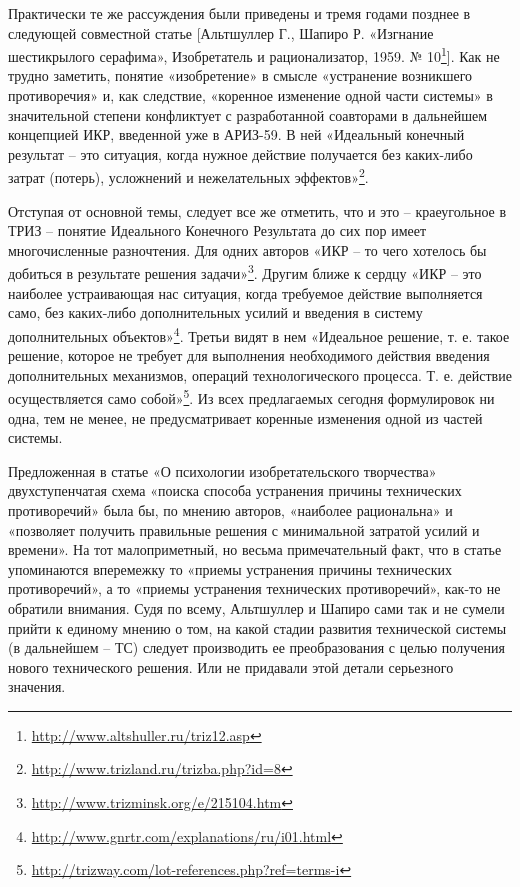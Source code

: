 \documentclass[11pt,a4paper]{article}
\begin{document}
Практически те же рассуждения были приведены и тремя годами позднее в
следующей совместной статье [Альтшуллер Г., Шапиро Р. «Изгнание шестикрылого
  серафима», Изобретатель и рационализатор, 1959. №
  10\footnote{\url{http://www.altshuller.ru/triz12.asp}}]. Как не трудно
заметить, понятие «изобретение» в смысле «устранение возникшего противоречия»
и, как следствие, «коренное изменение одной части системы» в значительной
степени конфликтует с разработанной соавторами в дальнейшем концепцией ИКР,
введенной уже в АРИЗ-59.  В ней «Идеальный конечный результат -- это ситуация,
когда нужное действие получается без каких-либо затрат (потерь), усложнений и
нежелательных
эффектов»\footnote{\url{http://www.trizland.ru/trizba.php?id=8}}.

Отступая от основной темы, следует все же отметить, что и это -- краеугольное
в ТРИЗ -- понятие Идеального Конечного Результата до сих пор имеет
многочисленные разночтения. Для одних авторов «ИКР -- то чего хотелось бы
добиться в результате решения
задачи»\footnote{\url{http://www.trizminsk.org/e/215104.htm}}. Другим ближе к
сердцу «ИКР -- это наиболее устраивающая нас ситуация, когда требуемое
действие выполняется само, без каких-либо дополнительных усилий и введения в
систему дополнительных
объектов»\footnote{\url{http://www.gnrtr.com/explanations/ru/i01.html}}. Третьи
видят в нем «Идеальное решение, т. е. такое решение, которое не требует для
выполнения необходимого действия введения дополнительных механизмов, операций
технологического процесса. Т. е. действие осуществляется само
собой»\footnote{\url{http://trizway.com/lot-references.php?ref=terms-i}}. Из
всех предлагаемых сегодня формулировок ни одна, тем не менее, не
предусматривает коренные изменения одной из частей системы.

Предложенная в статье «О психологии изобретательского творчества»
двухступенчатая схема «поиска способа устранения причины технических
противоречий» была бы, по мнению авторов, «наиболее рациональна» и «позволяет
получить правильные решения с минимальной затратой усилий и времени». На тот
малоприметный, но весьма примечательный факт, что в статье упоминаются
вперемежку то «приемы устранения причины технических противоречий», а то
«приемы устранения технических противоречий», как-то не обратили
внимания. Судя по всему, Альтшуллер и Шапиро сами так и не сумели прийти к
единому мнению о том, на какой стадии развития технической системы (в
дальнейшем -- ТС) следует производить ее преобразования с целью получения
нового технического решения. Или не придавали этой детали серьезного значения.
\end{document}
